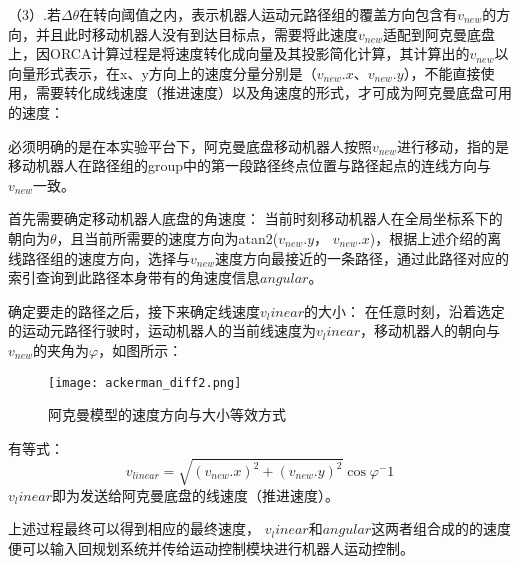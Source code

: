 （3）.若$\varDelta \theta$在转向阈值之内，表示机器人运动元路径组的覆盖方向包含有$v_{new}$的方向，并且此时移动机器人没有到达目标点，需要将此速度$v_{new}$适配到阿克曼底盘上，因ORCA计算过程是将速度转化成向量及其投影简化计算，其计算出的$v_{new}$以向量形式表示，在x、y方向上的速度分量分别是（$v_{new}.x$、$v_{new}.y$），不能直接使用，需要转化成线速度（推进速度）以及角速度的形式，才可成为阿克曼底盘可用的速度：


    必须明确的是在本实验平台下，阿克曼底盘移动机器人按照$v_{new}$进行移动，指的是移动机器人在路径组的group中的第一段路径终点位置与路径起点的连线方向与$v_{new}$一致。

    首先需要确定移动机器人底盘的角速度：
    当前时刻移动机器人在全局坐标系下的朝向为$\theta$，且当前所需要的速度方向为atan2($v_{new}.y$， $v_{new}.x$)，根据上述介绍的离线路径组的速度方向，选择与$v_{new}$速度方向最接近的一条路径，通过此路径对应的索引查询到此路径本身带有的角速度信息$angular$。

    确定要走的路径之后，接下来确定线速度$v_linear$的大小：
    在任意时刻，沿着选定的运动元路径行驶时，运动机器人的当前线速度为$v_linear$，移动机器人的朝向与$v_{new}$的夹角为$ \varphi$，如图所示：
    \begin{figure}[ht]
        \centering
        \texttt{[image: ackerman\_diff2.png]}
        \caption{阿克曼模型的速度方向与大小等效方式}
    \end{figure}
    有等式：
    \begin{equation}
        v_{linear}  = \sqrt{(v_{new}.x)^2 + (v_{new}.y)^2} {\cos\varphi}^-1 
    \end{equation}
    $v_linear$即为发送给阿克曼底盘的线速度（推进速度）。

上述过程最终可以得到相应的最终速度， $v_linear$和$angular$这两者组合成的的速度便可以输入回规划系统并传给运动控制模块进行机器人运动控制。




